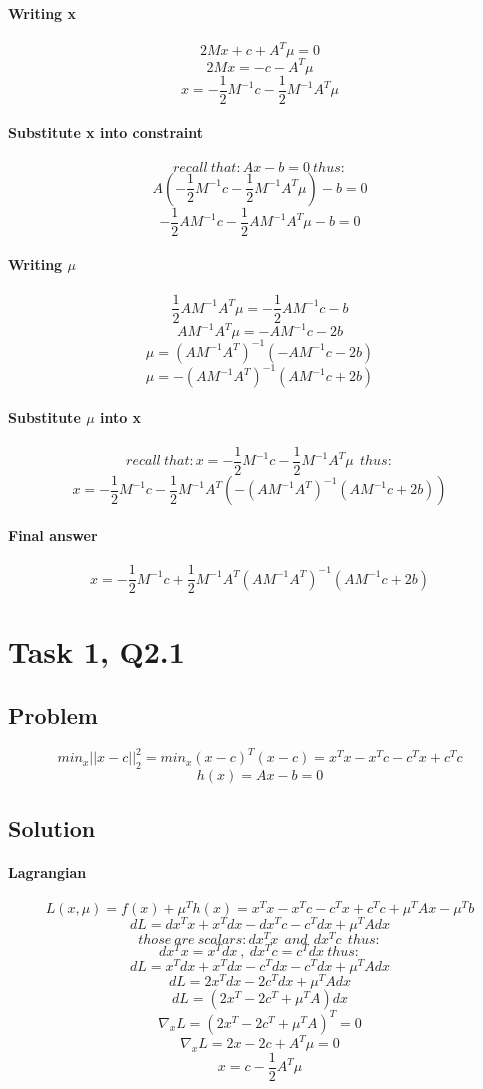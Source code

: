 \documentclass[12pt]{article}
\begin{document}
\paragraph{Writing x}
\[2Mx + c + A^T \mu = 0 \]
\[2Mx = - c - A^T \mu\]
\[x = - \frac{1}{2} M^{-1}c - \frac{1}{2} M^{-1}A^T \mu\]
\paragraph{Substitute x into constraint}
\[recall\  that: Ax - b = 0\ thus:\]
\[A(- \frac{1}{2} M^{-1}c - \frac{1}{2} M^{-1}A^T \mu) - b = 0 \]
\[- \frac{1}{2} AM^{-1}c - \frac{1}{2} AM^{-1}A^T \mu - b = 0 \]
\paragraph{Writing $\mu$}
\[\frac{1}{2} AM^{-1}A^T \mu = - \frac{1}{2} AM^{-1}c - b \]
\[AM^{-1}A^T \mu = - AM^{-1}c - 2b \]
\[ \mu = (AM^{-1}A^T)^{-1}(- AM^{-1}c - 2b)\]
\[ \mu = -(AM^{-1}A^T)^{-1}(AM^{-1}c + 2b)\]
\paragraph{Substitute $\mu$ into x}
\[recall\  that: x = - \frac{1}{2} M^{-1}c - \frac{1}{2} M^{-1}A^T \mu \ \ thus:\]
\[x = - \frac{1}{2} M^{-1}c - \frac{1}{2} M^{-1}A^T (-(AM^{-1}A^T)^{-1}(AM^{-1}c + 2b))\]
\paragraph{Final answer}
\[x = - \frac{1}{2} M^{-1}c + \frac{1}{2} M^{-1}A^T (AM^{-1}A^T)^{-1}(AM^{-1}c + 2b)\]

\newpage
\section{Task 1, Q2.1}
\subsection{Problem}
\[min_x ||x-c||_2 ^2 = min_x (x-c)^T (x-c) = x^T x - x^T c - c^T x + c^T c\]
\[h(x)= Ax -b = 0 \]
\subsection{Solution}
\paragraph{Lagrangian}
\[L(x,\mu)=f(x) + \mu ^T h(x) = x^T x - x^T c - c^T x + c^T c + \mu ^T Ax - \mu ^T b\]
\[dL = dx^T x + x^T dx - dx^T c - c^T dx + \mu ^T Adx \]
\[those \ are \ scalars: dx^T x \ \ and \ \ dx^T c \ \ thus: \]
\[dx^T x = x^T dx \ , \ dx^T c = c^T dx \ thus: \]
\[dL = x^T dx + x^T dx - c^T dx - c^T dx + \mu ^T Adx \]
\[dL = 2x^T dx - 2c^T dx + \mu ^T Adx \]
\[dL = (2x^T - 2c^T + \mu ^T A)dx \]
\[\nabla_x L = (2x^T - 2c^T + \mu ^T A)^T = 0 \]
\[\nabla_x L = 2x - 2c + A^T \mu = 0 \]
\[x= c - \frac{1}{2} A^T \mu \]
\end{document}
